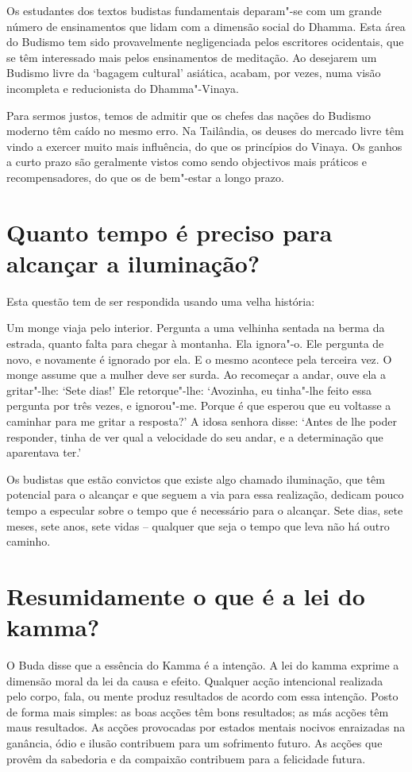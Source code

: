 Os estudantes dos textos budistas fundamentais deparam"-se com um grande
número de ensinamentos que lidam com a dimensão social do Dhamma. Esta
área do Budismo tem sido provavelmente negligenciada pelos escritores
ocidentais, que se têm interessado mais pelos ensinamentos de meditação.
Ao desejarem um Budismo livre da `bagagem cultural' asiática, acabam,
por vezes, numa visão incompleta e reducionista do Dhamma"-Vinaya.

Para sermos justos, temos de admitir que os chefes das nações do Budismo
moderno têm caído no mesmo erro. Na Tailândia, os deuses do mercado
livre têm vindo a exercer muito mais influência, do que os princípios do
Vinaya. Os ganhos a curto prazo são geralmente vistos como sendo
objectivos mais práticos e recompensadores, do que os de bem"-estar a
longo prazo.

\section{Quanto tempo é preciso para alcançar a iluminação?}

Esta questão tem de ser respondida usando uma velha história:

Um monge viaja pelo interior. Pergunta a uma velhinha sentada na berma
da estrada, quanto falta para chegar à montanha. Ela ignora"-o. Ele
pergunta de novo, e novamente é ignorado por ela. E o mesmo acontece
pela terceira vez. O monge assume que a mulher deve ser surda. Ao
recomeçar a andar, ouve ela a gritar"-lhe: `Sete dias!' Ele
retorque"-lhe: `Avozinha, eu tinha"-lhe feito essa pergunta por três
vezes, e ignorou"-me. Porque é que esperou que eu voltasse a caminhar
para me gritar a resposta?' A idosa senhora disse: `Antes de lhe
poder responder, tinha de ver qual a velocidade do seu andar, e a
determinação que aparentava ter.'

Os budistas que estão convictos que existe algo chamado iluminação, que
têm potencial para o alcançar e que seguem a via para essa realização,
dedicam pouco tempo a especular sobre o tempo que é necessário para o
alcançar. Sete dias, sete meses, sete anos, sete vidas -- qualquer que
seja o tempo que leva não há outro caminho.

\section{Resumidamente o que é a lei do kamma?}

O Buda disse que a essência do Kamma é a intenção. A lei do kamma
exprime a dimensão moral da lei da causa e efeito. Qualquer acção
intencional realizada pelo corpo, fala, ou mente produz resultados de
acordo com essa intenção. Posto de forma mais simples: as boas acções
têm bons resultados; as más acções têm maus resultados. As acções
provocadas por estados mentais nocivos enraizadas na ganância, ódio e
ilusão contribuem para um sofrimento futuro. As acções que provêm da
sabedoria e da compaixão contribuem para a felicidade futura.

